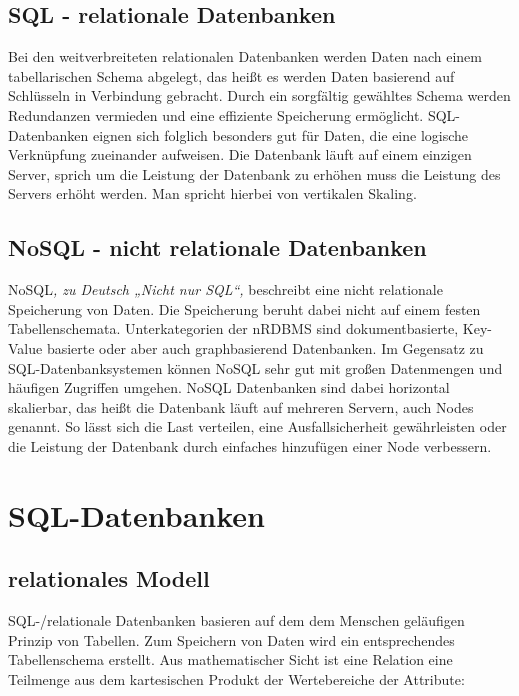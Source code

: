 \documentclass[12pt, a4paper, twoside]{article}
\begin{document}
	\subsection{SQL - relationale Datenbanken}
		Bei den weitverbreiteten relationalen Datenbanken werden Daten nach einem tabellarischen Schema abgelegt, das heißt es werden Daten basierend auf Schlüsseln in Verbindung gebracht. Durch ein sorgfältig gewähltes Schema werden Redundanzen vermieden und eine effiziente Speicherung ermöglicht. SQL-Datenbanken eignen sich folglich besonders gut für Daten, die eine logische Verknüpfung zueinander aufweisen. Die Datenbank läuft auf einem einzigen Server, sprich um die Leistung der Datenbank zu erhöhen muss die Leistung des Servers erhöht werden. Man spricht hierbei von vertikalen Skaling. 
		\cite{ibm-sql-nosql}\cite{Meier:SQLNoSQLDatenbanken}
	\subsection{NoSQL - nicht relationale Datenbanken}
		NoSQL\textit{, zu Deutsch „Nicht nur SQL“, }beschreibt eine nicht relationale Speicherung von Daten. Die Speicherung beruht dabei nicht auf einem festen Tabellenschemata. Unterkategorien der \ac{nRDBMS} sind dokumentbasierte, Key-Value basierte oder aber auch graphbasierend Datenbanken. Im Gegensatz zu SQL-Datenbanksystemen können NoSQL sehr gut mit großen Datenmengen und häufigen Zugriffen umgehen. NoSQL Datenbanken sind dabei horizontal skalierbar, das heißt die Datenbank läuft auf mehreren Servern, auch Nodes genannt. So lässt sich die Last verteilen, eine Ausfallsicherheit gewährleisten oder die Leistung der Datenbank durch einfaches hinzufügen einer Node verbessern. 
		\cite{ibm-sql-nosql} \cite{Meier:SQLNoSQLDatenbanken}
		
\section{SQL-Datenbanken}
	\subsection{relationales Modell}
		SQL-/relationale Datenbanken basieren auf dem dem Menschen geläufigen Prinzip von Tabellen. Zum Speichern von Daten wird ein entsprechendes Tabellenschema erstellt. Aus mathematischer Sicht ist eine Relation eine Teilmenge aus dem kartesischen Produkt der Wertebereiche der Attribute:
		
\end{document}

